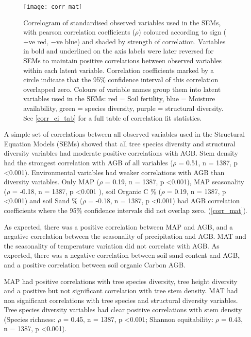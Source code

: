 \documentclass[11pt,a4paper]{article}
\begin{document}
\begin{figure}[H]
\centering
	\texttt{[image: corr\_mat]}
	\caption{Correlogram of standardised observed variables used in the SEMs, with pearson correlation coefficients ($\rho$) coloured according to sign ($+$ve red, $-$ve blue) and shaded by strength of correlation. Variables in bold and underlined on the axis labels were later reversed for SEMs to maintain positive correlations between observed variables within each latent variable. Correlation coefficients marked by a circle indicate that the 95\% confidence interval of this correlation overlapped zero. Colours of variable names group them into latent variables used in the SEMs: red = Soil fertility, blue = Moisture availability, green = species diversity, purple = structural diversity. See \autoref{corr_ci_tab} for a full table of correlation fit statistics.}
	\label{corr_mat}
\end{figure}

A simple set of correlations between all observed variables used in the Structural Equation Models (SEMs) showed that all tree species diversity and structural diversity variables had moderate positive correlations with AGB. Stem density had the strongest correlation with AGB of all variables ($\rho$ = 0.51, n = 1387, p <0.001). Environmental variables had weaker correlations with AGB than diversity variables. Only MAP ($\rho$ = 0.19, n = 1387, p <0.001), MAP seasonality ($\rho$ = -0.18, n = 1387, p <0.001 ), soil Organic C \% ($\rho$ = 0.19, n = 1387, p <0.001) and soil Sand \% ($\rho$ = -0.18, n = 1387, p <0.001) had AGB correlation coefficients where the 95\% confidence intervals did not overlap zero. (\autoref{corr_mat}). 

As expected, there was a positive correlation between MAP and AGB, and a negative correlation between the seasonality of precipitation and AGB. MAT and the seasonality of temperature variation did not correlate with AGB. As expected, there was a negative correlation between soil sand content and AGB, and a positive correlation between soil organic Carbon AGB.

MAP had positive correlations with tree species diversity, tree height diversity and a positive but not significant correlation with tree stem density. MAT had non significant correlations with tree species and structural diversity variables. Tree species diversity variables had clear positive correlations with stem density (Species richness: $\rho$ = 0.45, n = 1387, p <0.001; Shannon equitability: $\rho$ = 0.43, n = 1387, p <0.001). 
\end{document}

